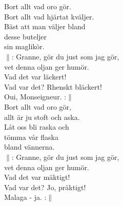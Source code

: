 \documentclass[a6paper,10pt]{article}
\begin{document}
\setlength{\oddsidemargin}{-0.47in}
\noindent
\begin{center}
\end{center}
\begin{lyrics}
Bort allt vad oro gör.\\
Bort allt vad hjärtat kväljer.\\
Bäst att man väljer bland\\
desse buteljer\\
sin maglikör.
\vspace{5pt}\\
$\|$: Granne, gör du just som jag gör,\\
vet denna oljan ger humör.\\
Vad det var läckert!\\
Vad var det? Rhenskt bläckert!\\
Oui, Monseigneur. :$\|$
\vspace{5pt}\\
Bort allt vad oro gör,\\
allt är ju stoft och aska.\\
Låt oss bli raska och\\
tömma vår flaska\\
bland vännerna.
\vspace{5pt}\\
$\|$: Granne, gör du just som jag gör,\\
vet denna oljan ger humör.\\
Vad det var mäktigt!\\
Vad var det? Jo, präktigt!\\
Malaga - ja. :$\|$
\end{lyrics}
\end{document}

